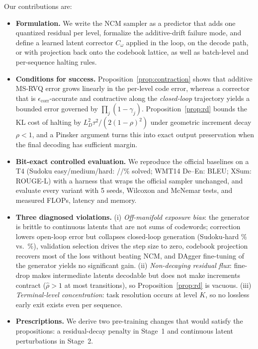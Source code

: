 Our contributions are:
\begin{itemize}
\item \textbf{Formulation.} We write the NCM sampler as a predictor that adds one quantized residual per level, formalize the additive-drift failure mode, and define a learned latent corrector $C_\omega$ applied in the loop, on the decode path, or with projection back onto the codebook lattice, as well as batch-level and per-sequence halting rules.
\item \textbf{Conditions for success.} Proposition~\ref{prop:contraction} shows that additive MS-RVQ error grows linearly in the per-level code error, whereas a corrector that is $\epsilon_{\mathrm{corr}}$-accurate and contractive along the \emph{closed-loop} trajectory yields a bounded error governed by $\prod_j(1-\gamma_j)$. Proposition~\ref{prop:rd} bounds the KL cost of halting by $L_D^2\tau^2/(2(1-\rho)^2)$ under geometric increment decay $\rho<1$, and a Pinsker argument turns this into exact output preservation when the final decoding has sufficient margin.
\item \textbf{Bit-exact controlled evaluation.} We reproduce the official baselines on a T4 (Sudoku easy/medium/hard: \OffEasy/\OffMedium/\OffHard\% solved; WMT14 De--En: \OffWmt{} BLEU; XSum: \OffXsumRL{} ROUGE-L) with a harness that wraps the official sampler unchanged, and evaluate every variant with 5 seeds, Wilcoxon and McNemar tests, and measured FLOPs, latency and memory.
\item \textbf{Three diagnosed violations.} (i) \emph{Off-manifold exposure bias}: the generator is brittle to continuous latents that are not sums of codewords; correction lowers open-loop error but collapses closed-loop generation (Sudoku-hard \LoopVoneHard\% vs.\ \BaseHard\%), validation selection drives the step size to zero, codebook projection recovers most of the loss without beating NCM, and DAgger fine-tuning of the generator yields no significant gain. (ii) \emph{Non-decaying residual flux}: fine-drop makes intermediate latents decodable but does not make increments contract ($\hat\rho>1$ at most transitions), so Proposition~\ref{prop:rd} is vacuous. (iii) \emph{Terminal-level concentration}: task resolution occurs at level $K$, so no lossless early exit exists even per sequence.
\item \textbf{Prescriptions.} We derive two pre-training changes that would satisfy the propositions: a residual-decay penalty in Stage~1 and continuous latent perturbations in Stage~2.
\end{itemize}

